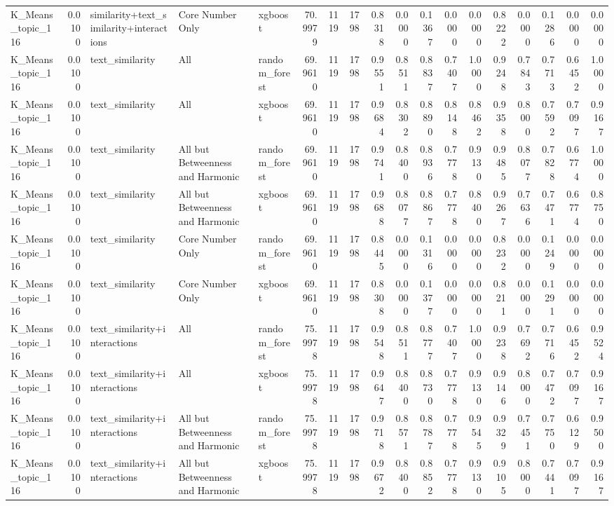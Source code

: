 \begin{tabular}{lrlllrrrrrrrrrrrrr}
K_Means_topic_116 & 0.0100 & similarity+text_similarity+interactions & Core Number Only & xgboost & 70.9979 & 1119 & 1798 & 0.8318 & 0.0000 & 0.1367 & 0.0000 & 0.0000 & 0.8222 & 0.0000 & 0.1286 & 0.0000 & 0.0000 \\
K_Means_topic_116 & 0.0100 & text_similarity & All & random_forest & 69.9610 & 1119 & 1798 & 0.9551 & 0.8511 & 0.8837 & 0.7407 & 1.0000 & 0.9248 & 0.7843 & 0.7713 & 0.6452 & 1.0000 \\
K_Means_topic_116 & 0.0100 & text_similarity & All & xgboost & 69.9610 & 1119 & 1798 & 0.9684 & 0.8302 & 0.8890 & 0.8148 & 0.8462 & 0.9358 & 0.8000 & 0.7592 & 0.7097 & 0.9167 \\
K_Means_topic_116 & 0.0100 & text_similarity & All but Betweenness and Harmonic & random_forest & 69.9610 & 1119 & 1798 & 0.9741 & 0.8400 & 0.8936 & 0.7778 & 0.9130 & 0.9485 & 0.8077 & 0.7828 & 0.6774 & 1.0000 \\
K_Means_topic_116 & 0.0100 & text_similarity & All but Betweenness and Harmonic & xgboost & 69.9610 & 1119 & 1798 & 0.9688 & 0.8077 & 0.8867 & 0.7778 & 0.8400 & 0.9267 & 0.7636 & 0.7471 & 0.6774 & 0.8750 \\
K_Means_topic_116 & 0.0100 & text_similarity & Core Number Only & random_forest & 69.9610 & 1119 & 1798 & 0.8445 & 0.0000 & 0.1316 & 0.0000 & 0.0000 & 0.8232 & 0.0000 & 0.1249 & 0.0000 & 0.0000 \\
K_Means_topic_116 & 0.0100 & text_similarity & Core Number Only & xgboost & 69.9610 & 1119 & 1798 & 0.8308 & 0.0000 & 0.1377 & 0.0000 & 0.0000 & 0.8211 & 0.0000 & 0.1291 & 0.0000 & 0.0000 \\
K_Means_topic_116 & 0.0100 & text_similarity+interactions & All & random_forest & 75.9978 & 1119 & 1798 & 0.9548 & 0.8511 & 0.8777 & 0.7407 & 1.0000 & 0.9238 & 0.7692 & 0.7716 & 0.6452 & 0.9524 \\
K_Means_topic_116 & 0.0100 & text_similarity+interactions & All & xgboost & 75.9978 & 1119 & 1798 & 0.9647 & 0.8400 & 0.8730 & 0.7778 & 0.9130 & 0.9146 & 0.8000 & 0.7472 & 0.7097 & 0.9167 \\
K_Means_topic_116 & 0.0100 & text_similarity+interactions & All but Betweenness and Harmonic & random_forest & 75.9978 & 1119 & 1798 & 0.9718 & 0.8571 & 0.8787 & 0.7778 & 0.9545 & 0.9329 & 0.7451 & 0.7750 & 0.6129 & 0.9500 \\
K_Means_topic_116 & 0.0100 & text_similarity+interactions & All but Betweenness and Harmonic & xgboost & 75.9978 & 1119 & 1798 & 0.9672 & 0.8400 & 0.8852 & 0.7778 & 0.9130 & 0.9105 & 0.8000 & 0.7441 & 0.7097 & 0.9167 \\

\end{tabular}

